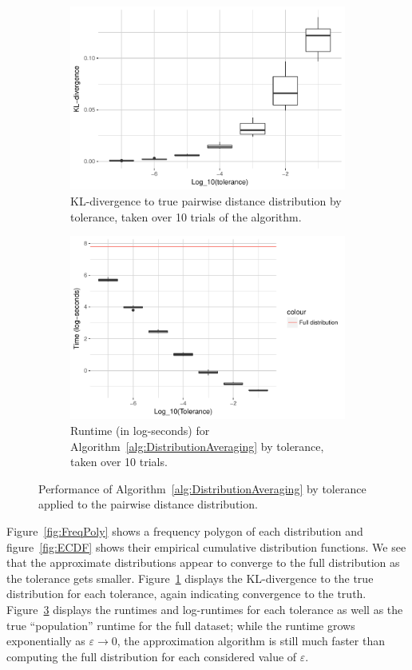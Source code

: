\documentclass{article}
\begin{document}
\begin{figure}
\begin{subfigure}{.5\textwidth}
        \includegraphics[width=\linewidth]{Figures/PairwiseDistance/div_by_tol.pdf}
    	\caption{KL-divergence to true pairwise distance distribution by tolerance, taken over 10 trials of the algorithm.}
    	\label{fig:Divergences}
	\end{subfigure}
    \begin{subfigure}{.5\textwidth}
    	\includegraphics[width=0.9\linewidth]{Figures/PairwiseDistance/log_time_by_tol.pdf}
    	\caption{Runtime (in log-seconds) for Algorithm~\ref{alg:DistributionAveraging} by tolerance, taken over 10 trials.}
    	\label{fig:Times}
    \end{subfigure}
    \caption{Performance of Algorithm~\ref{alg:DistributionAveraging} by tolerance applied to the pairwise distance distribution.}
\end{figure}
Figure~\ref{fig:FreqPoly} shows a frequency polygon of each distribution and figure~\ref{fig:ECDF} shows their empirical cumulative distribution functions.
We see that the approximate distributions appear to converge to the full distribution as the tolerance gets smaller.
Figure~\ref{fig:Divergences} displays the KL-divergence to the true distribution for each tolerance, again indicating convergence to the truth.
Figure~\ref{fig:Times} displays the runtimes and log-runtimes for each tolerance as well as the true ``population'' runtime for the full dataset; while the runtime grows exponentially as $\varepsilon \to 0$, the approximation algorithm is still much faster than computing the full distribution for each considered value of $\varepsilon$.
\end{document}
